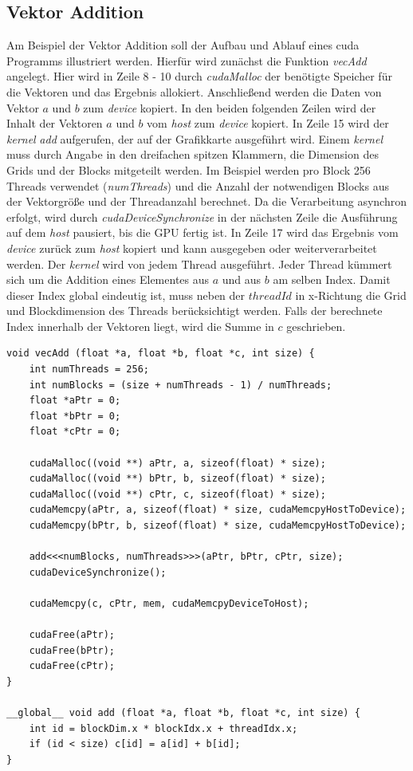 
\subsection{Vektor Addition}

Am Beispiel der Vektor Addition soll der Aufbau und Ablauf eines cuda Programms illustriert werden. Hierfür wird zunächst die Funktion \textit{vecAdd} angelegt. Hier wird in Zeile 8 - 10 durch \textit{cudaMalloc} der benötigte Speicher für die Vektoren und das Ergebnis allokiert. Anschließend werden die Daten von Vektor $a$ und $b$ zum \textit{device} kopiert. In den beiden folgenden Zeilen wird der Inhalt der Vektoren $a$ und $b$ vom \textit{host} zum \textit{device} kopiert. In Zeile 15 wird der \textit{kernel} \textit{add} aufgerufen, der auf der Grafikkarte ausgeführt wird. Einem \textit{kernel} muss durch Angabe in den dreifachen spitzen Klammern, die Dimension des Grids und der Blocks mitgeteilt werden. Im Beispiel werden pro Block 256 Threads verwendet (\textit{numThreads}) und die Anzahl der notwendigen Blocks aus der Vektorgröße und der Threadanzahl berechnet. Da die Verarbeitung asynchron erfolgt, wird durch \textit{cudaDeviceSynchronize} in der nächsten Zeile die Ausführung auf dem \textit{host} pausiert, bis die GPU fertig ist. In Zeile 17 wird das Ergebnis vom \textit{device} zurück zum \textit{host} kopiert und kann ausgegeben oder weiterverarbeitet werden.
Der \textit{kernel} wird von jedem Thread ausgeführt. Jeder Thread kümmert sich um die Addition eines Elementes aus $a$ und aus $b$ am selben Index. Damit dieser Index global eindeutig ist, muss neben der $threadId$ in x-Richtung die Grid und Blockdimension des Threads berücksichtigt werden. Falls der berechnete Index innerhalb der Vektoren liegt, wird die Summe in $c$ geschrieben.

\lstset{language=C}
\begin{lstlisting}
void vecAdd (float *a, float *b, float *c, int size) {
	int numThreads = 256;
	int numBlocks = (size + numThreads - 1) / numThreads;
	float *aPtr = 0;
	float *bPtr = 0;
	float *cPtr = 0;	
	
	cudaMalloc((void **) aPtr, a, sizeof(float) * size);
	cudaMalloc((void **) bPtr, b, sizeof(float) * size);
	cudaMalloc((void **) cPtr, c, sizeof(float) * size);	
	cudaMemcpy(aPtr, a, sizeof(float) * size, cudaMemcpyHostToDevice);
	cudaMemcpy(bPtr, b, sizeof(float) * size, cudaMemcpyHostToDevice);	
	
	add<<<numBlocks, numThreads>>>(aPtr, bPtr, cPtr, size);
	cudaDeviceSynchronize();
	
	cudaMemcpy(c, cPtr, mem, cudaMemcpyDeviceToHost);
	
	cudaFree(aPtr);
	cudaFree(bPtr);
	cudaFree(cPtr);
}

__global__ void add (float *a, float *b, float *c, int size) {
	int id = blockDim.x * blockIdx.x + threadIdx.x;
	if (id < size) c[id] = a[id] + b[id];
}
\end{lstlisting} 


